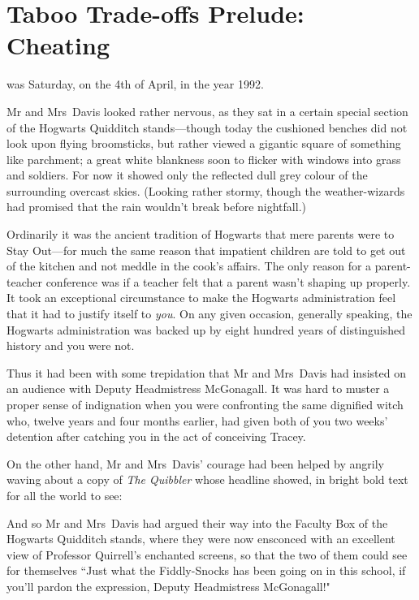 \chapter{Taboo Trade-offs Prelude: Cheating}

 was Saturday, on the 4th of April, in the year 1992.

\hplettrineextrapara
Mr and Mrs~Davis looked rather nervous, as they sat in a certain special section of the Hogwarts Quidditch stands—though today the cushioned benches did not look upon flying broomsticks, but rather viewed a gigantic square of something like parchment; a great white blankness soon to flicker with windows into grass and soldiers. For now it showed only the reflected dull grey colour of the surrounding overcast skies. (Looking rather stormy, though the weather-wizards had promised that the rain wouldn't break before nightfall.)

Ordinarily it was the ancient tradition of Hogwarts that mere parents were to Stay Out—for much the same reason that impatient children are told to get out of the kitchen and not meddle in the cook's affairs. The only reason for a parent-teacher conference was if a teacher felt that a parent wasn't shaping up properly. It took an exceptional circumstance to make the Hogwarts administration feel that it had to justify itself to \emph{you}. On any given occasion, generally speaking, the Hogwarts administration was backed up by eight hundred years of distinguished history and you were not.

Thus it had been with some trepidation that Mr and Mrs~Davis had insisted on an audience with Deputy Headmistress McGonagall. It was hard to muster a proper sense of indignation when you were confronting the same dignified witch who, twelve years and four months earlier, had given both of you two weeks' detention after catching you in the act of conceiving Tracey.

On the other hand, Mr and Mrs~Davis' courage had been helped by angrily waving about a copy of \emph{The Quibbler} whose headline showed, in bright bold text for all the world to see:


And so Mr and Mrs~Davis had argued their way into the Faculty Box of the Hogwarts Quidditch stands, where they were now ensconced with an excellent view of Professor Quirrell's enchanted screens, so that the two of them could see for themselves ``Just what the Fiddly-Snocks has been going on in this school, if you'll pardon the expression, Deputy Headmistress McGonagall!"

